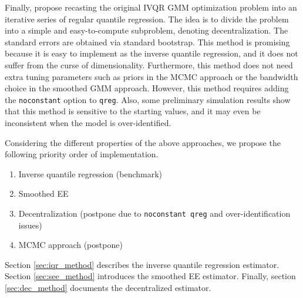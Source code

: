 Finally, \cite{Kaido2021} propose recasting the original IVQR GMM
optimization problem into an iterative series of regular quantile regression.
The idea is to divide the problem into a simple and easy-to-compute subproblem,
denoting decentralization. The standard errors are obtained via
standard bootstrap. This method is promising because it is easy to implement as
the inverse quantile regression, and it does not suffer from the curse of
dimensionality. Furthermore, this method does not need extra tuning parameters
such as priors in the MCMC approach or the bandwidth choice in the smoothed GMM
approach.  However, this method requires adding the {\tt noconstant} option to
{\tt qreg}. Also, some preliminary simulation results show that this method is
sensitive to the starting values, and it may even be inconsistent when the model
is over-identified.

Considering the different properties of the above approaches, we propose the
following priority order of implementation.

\begin{enumerate}

\item Inverse quantile regression (benchmark)

\item Smoothed EE 

\item Decentralization (postpone due to {\tt noconstant qreg} and
over-identification issues)

\item MCMC approach (postpone)

\end{enumerate}

Section \ref{sec:iqr_method} describes the inverse quantile regression
estimator.  Section \ref{sec:see_method} introduces the smoothed EE estimator.
Finally, section \ref{sec:dec_method} documents the decentralized estimator.

